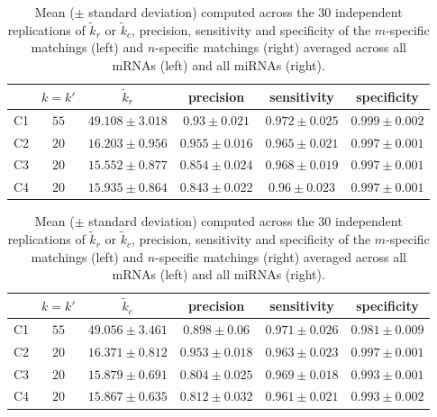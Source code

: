 \begin{table}
{    \begin{minipage}{.5\linewidth}
      \centering
      \begin{tabular}{c|c|c|c|c|c}
        & $k=k'$ & $\tilde{k}_r$ & precision & sensitivity & specificity\\
        \hline
        C1 &$ 55 $&$ 49.108 \pm 3.018 $&$ 0.93 \pm 0.021 $&$ 0.972 \pm 0.025 $&$ 0.999 \pm 0.002 $\\
        C2&$ 20 $&$ 16.203 \pm 0.956 $&$ 0.955 \pm 0.016 $&$ 0.965 \pm 0.021 $&$ 0.997 \pm 0.001 $\\
        C3&$ 20 $&$ 15.552 \pm 0.877 $&$ 0.854 \pm 0.024 $&$ 0.968 \pm 0.019 $&$ 0.997 \pm 0.001 $\\
        C4&$ 20 $&$ 15.935 \pm 0.864 $&$ 0.843 \pm 0.022 $&$ 0.96 \pm 0.023 $&$ 0.997 \pm 0.001 $\\
        \hline
      \end{tabular}
 \end{minipage}
    \begin{minipage}{.5\linewidth}
      \centering
      \begin{tabular}{c|c|c|c|c|c}
        & $k=k'$ & $\tilde{k}_c$ & precision & sensitivity & specificity\\
        \hline
        C1 &$ 55 $&$ 49.056 \pm 3.461 $&$ 0.898 \pm 0.06 $&$ 0.971 \pm 0.026 $&$ 0.981 \pm 0.009 $\\
        C2&$ 20 $&$ 16.371 \pm 0.812 $&$ 0.953 \pm 0.018 $&$ 0.963 \pm 0.023 $&$ 0.997 \pm 0.001 $\\
        C3&$ 20 $&$ 15.879 \pm 0.691 $&$ 0.804 \pm 0.025 $&$ 0.969 \pm 0.018 $&$ 0.993 \pm 0.001 $\\
        C4&$ 20 $&$ 15.867 \pm 0.635 $&$ 0.812 \pm 0.032 $&$ 0.961 \pm 0.021 $&$ 0.993 \pm 0.002 $\\
      \end{tabular}
    \end{minipage}
  \caption{Mean   ($\pm$  standard   deviation)  computed   across  the   30
    independent   replications   of  $\tilde{k}_{r}$   or   $\tilde{k}_{c}$,
    precision,  sensitivity and  specificity of  the $m$-specific  matchings
    (left)  and $n$-specific  matchings  (right) averaged  across all  mRNAs
    (left) and all miRNAs (right).   \label{tab:simulC:results:matching}}
}
\end{table}


